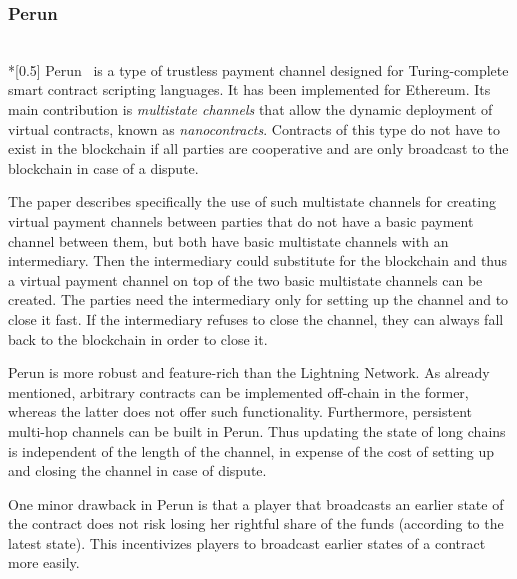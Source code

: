 \subsubsection{Perun} \ \\*[0.5\baselineskip]
  Perun~\cite{perun} is a type of trustless payment channel designed for Turing-complete
  smart contract scripting languages. It has been implemented for Ethereum. Its main
  contribution is \textit{multistate channels} that allow the dynamic deployment of
  virtual contracts, known as \textit{nanocontracts}. Contracts of this type do not have
  to exist in the blockchain if all parties are cooperative and are only broadcast to the
  blockchain in case of a dispute.

  The paper describes specifically the use of such multistate channels for creating
  virtual payment channels between parties that do not have a basic payment channel
  between them, but both have basic multistate channels with an intermediary. Then the
  intermediary could substitute for the blockchain and thus a virtual payment channel on
  top of the two basic multistate channels can be created. The parties need the
  intermediary only for setting up the channel and to close it fast. If the intermediary
  refuses to close the channel, they can always fall back to the blockchain in order to
  close it.

  Perun is more robust and feature-rich than the Lightning Network. As already mentioned,
  arbitrary contracts can be implemented off-chain in the former, whereas the latter does
  not offer such functionality. Furthermore, persistent multi-hop channels can be built in
  Perun. Thus updating the state of long chains is independent of the length of the
  channel, in expense of the cost of setting up and closing the channel in case of
  dispute.

  One minor drawback in Perun is that a player that broadcasts an earlier state of the
  contract does not risk losing her rightful share of the funds (according to the latest
  state). This incentivizes players to broadcast earlier states of a contract more easily.
